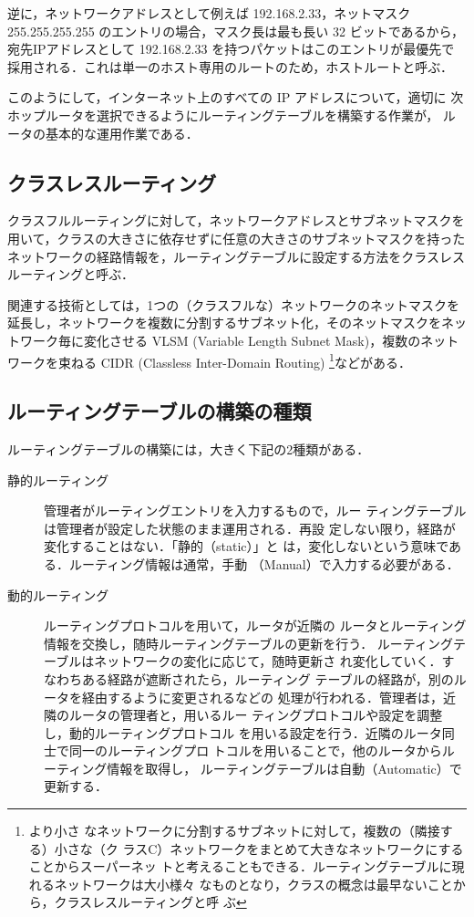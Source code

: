 逆に，ネットワークアドレスとして例えば 192.168.2.33，ネットマスク
255.255.255.255 のエントリの場合，マスク長は最も長い 32 ビットであるから，
宛先IPアドレスとして 192.168.2.33 を持つパケットはこのエントリが最優先で
採用される．これは単一のホスト専用のルートのため，ホストルートと呼ぶ．

このようにして，インターネット上のすべての IP アドレスについて，適切に
次ホップルータを選択できるようにルーティングテーブルを構築する作業が，
ルータの基本的な運用作業である．

\subsection{クラスレスルーティング}
クラスフルルーティングに対して，ネットワークアドレスとサブネットマスクを
用いて，クラスの大きさに依存せずに任意の大きさのサブネットマスクを持った
ネットワークの経路情報を，ルーティングテーブルに設定する方法をクラスレス
ルーティングと呼ぶ．

関連する技術としては，1つの（クラスフルな）ネットワークのネットマスクを
延長し，ネットワークを複数に分割するサブネット化，そのネットマスクをネッ
トワーク毎に変化させる VLSM (Variable Length Subnet Mask)，複数のネット
ワークを束ねる CIDR (Classless Inter-Domain Routing) \footnote{より小さ
なネットワークに分割するサブネットに対して，複数の（隣接する）小さな（ク
ラスC）ネットワークをまとめて大きなネットワークにすることからスーパーネッ
トと考えることもできる．ルーティングテーブルに現れるネットワークは大小様々
なものとなり，クラスの概念は最早ないことから，クラスレスルーティングと呼
ぶ}などがある．

\subsection{ルーティングテーブルの構築の種類}
ルーティングテーブルの構築には，大きく下記の2種類がある．
\begin{description}
\item[静的ルーティング] 管理者がルーティングエントリを入力するもので，ルー
	   ティングテーブルは管理者が設定した状態のまま運用される．再設
	   定しない限り，経路が変化することはない．「静的（static）」と
	   は，変化しないという意味である．ルーティング情報は通常，手動
	   （Manual）で入力する必要がある．
\item[動的ルーティング] ルーティングプロトコルを用いて，ルータが近隣の
  ルータとルーティング情報を交換し，随時ルーティングテーブルの更新を行う．
	   ルーティングテーブルはネットワークの変化に応じて，随時更新さ
	   れ変化していく．すなわちある経路が遮断されたら，ルーティング
	   テーブルの経路が，別のルータを経由するように変更されるなどの
	   処理が行われる．管理者は，近隣のルータの管理者と，用いるルー
	   ティングプロトコルや設定を調整し，動的ルーティングプロトコル
	   を用いる設定を行う．近隣のルータ同士で同一のルーティングプロ
	   トコルを用いることで，他のルータからルーティング情報を取得し，
	   ルーティングテーブルは自動（Automatic）で更新する．
\end{description}

